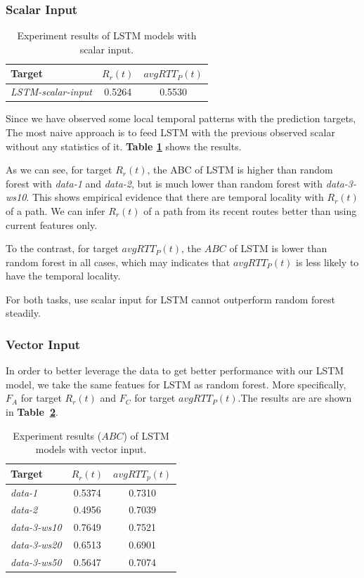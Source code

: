 \documentclass[sigconf]{acmart}
\begin{document}
	\subsubsection{Scalar Input}
	\begin{table}[t]
		\centering
		\begin{tabular}{lcc}
			\toprule
			{Target} &{$R_r(t)$} &{$avgRTT_P(t)$}\\
			\midrule
			\textit{LSTM-scalar-input} & 0.5264& 0.5530  \\
			\bottomrule
		\end{tabular}
		\caption{ Experiment results of LSTM models with scalar input. }
		\label{tab:lstm-scalar}
	\end{table}
	
	Since we have observed some local temporal patterns with the prediction targets, The most naive approach is to feed LSTM with the previous observed scalar without any statistics of it. \textbf{Table \ref{tab:lstm-scalar}} shows the results.
	
	As we can see, for target $R_r(t)$, the ABC of LSTM is higher than random forest with \textit{data-1} and \textit{data-2}, but is much lower than random forest with \textit{data-3-ws10}. This shows empirical evidence that there are temporal locality with $R_r(t)$ of a path. We can infer $R_r(t)$ of a path from its recent routes better than using current features only.
	
	To the contrast, for target $avgRTT_P(t)$, the $ABC$ of LSTM is lower than random forest in all cases, which may indicates that $avgRTT_P(t)$ is less likely to have the temporal locality.
	
	For both tasks, use scalar input for LSTM cannot outperform random forest steadily.
	
	\subsubsection{Vector Input}
	In order to better leverage the data to get better performance with our LSTM model, we take the same featues for LSTM as random forest. More specifically, $F_A$ for target $R_r(t)$ and $F_C$ for target $avgRTT_P(t)$.The results are are shown in \textbf{Table~\ref{tab:lstm-vector}}.
	\begin{table}[t]
		\centering
		\begin{tabular}{lcc}
			\toprule
			{Target} &{$R_r(t)$}&{$avgRTT_p(t)$} \\
			\midrule
			\textit{data-1}& 0.5374 & 0.7310 \\
			\textit{data-2}& 0.4956& 0.7039     \\
			\textit{data-3-ws10}& 0.7649 & 0.7521 \\
			\textit{data-3-ws20}& 0.6513& 0.6901    \\
			\textit{data-3-ws50}& 0.5647& 0.7074  \\
			\bottomrule	
		\end{tabular}
		\caption{ Experiment results ($ABC$) of LSTM models with vector input. }
		\label{tab:lstm-vector}
	\end{table}
	
\end{document}
